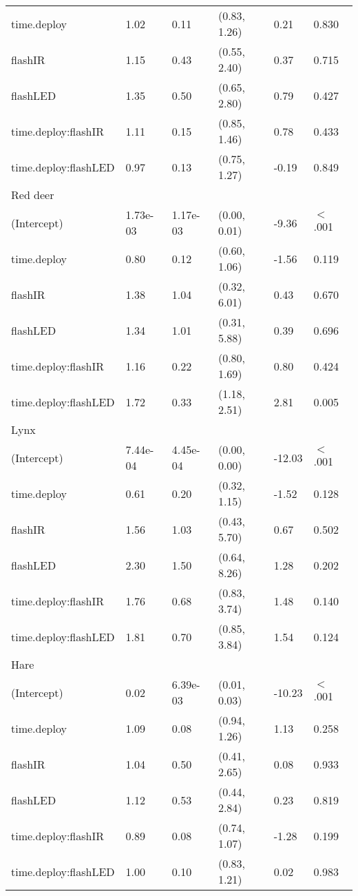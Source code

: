 \begin{table}[ht]
\begin{tabular}{llllll}
  time.deploy & 1.02 & 0.11 & (0.83, 1.26) & 0.21 & 0.830  \\ 
  flashIR & 1.15 & 0.43 & (0.55, 2.40) & 0.37 & 0.715  \\ 
  flashLED & 1.35 & 0.50 & (0.65, 2.80) & 0.79 & 0.427  \\ 
  time.deploy:flashIR & 1.11 & 0.15 & (0.85, 1.46) & 0.78 & 0.433  \\ 
  time.deploy:flashLED & 0.97 & 0.13 & (0.75, 1.27) & -0.19 & 0.849  \\ 
  Red deer &  &  &  &  &        \\ 
  (Intercept) & 1.73e-03 & 1.17e-03 & (0.00, 0.01) & -9.36 & $<$ .001 \\ 
  time.deploy & 0.80 & 0.12 & (0.60, 1.06) & -1.56 & 0.119  \\ 
  flashIR & 1.38 & 1.04 & (0.32, 6.01) & 0.43 & 0.670  \\ 
  flashLED & 1.34 & 1.01 & (0.31, 5.88) & 0.39 & 0.696  \\ 
  time.deploy:flashIR & 1.16 & 0.22 & (0.80, 1.69) & 0.80 & 0.424  \\ 
  time.deploy:flashLED & 1.72 & 0.33 & (1.18, 2.51) & 2.81 & 0.005  \\ 
  Lynx &  &  &  &  &        \\ 
  (Intercept) & 7.44e-04 & 4.45e-04 & (0.00, 0.00) & -12.03 & $<$ .001 \\ 
  time.deploy & 0.61 & 0.20 & (0.32, 1.15) & -1.52 & 0.128  \\ 
  flashIR & 1.56 & 1.03 & (0.43, 5.70) & 0.67 & 0.502  \\ 
  flashLED & 2.30 & 1.50 & (0.64, 8.26) & 1.28 & 0.202  \\ 
  time.deploy:flashIR & 1.76 & 0.68 & (0.83, 3.74) & 1.48 & 0.140  \\ 
  time.deploy:flashLED & 1.81 & 0.70 & (0.85, 3.84) & 1.54 & 0.124  \\ 
  Hare &  &  &  &  &        \\ 
  (Intercept) & 0.02 & 6.39e-03 & (0.01, 0.03) & -10.23 & $<$ .001 \\ 
  time.deploy & 1.09 & 0.08 & (0.94, 1.26) & 1.13 & 0.258  \\ 
  flashIR & 1.04 & 0.50 & (0.41, 2.65) & 0.08 & 0.933  \\ 
  flashLED & 1.12 & 0.53 & (0.44, 2.84) & 0.23 & 0.819  \\ 
  time.deploy:flashIR & 0.89 & 0.08 & (0.74, 1.07) & -1.28 & 0.199  \\ 
  time.deploy:flashLED & 1.00 & 0.10 & (0.83, 1.21) & 0.02 & 0.983  \\ 

\end{tabular}
\end{table}
